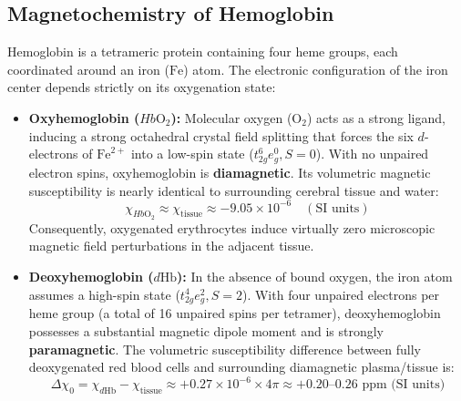 \documentclass[11pt,a4paper]{article}
\begin{document}
\subsection{Magnetochemistry of Hemoglobin}
Hemoglobin is a tetrameric protein containing four heme groups, each coordinated around an iron ($\text{Fe}$) atom. The electronic configuration of the iron center depends strictly on its oxygenation state:
\begin{itemize}[leftmargin=2em]
    \item \textbf{Oxyhemoglobin ($Hb\text{O}_2$):} Molecular oxygen ($\text{O}_2$) acts as a strong ligand, inducing a strong octahedral crystal field splitting that forces the six $d$-electrons of $\text{Fe}^{2+}$ into a low-spin state ($t_{2g}^6 e_g^0, S = 0$). With no unpaired electron spins, oxyhemoglobin is \textbf{diamagnetic}. Its volumetric magnetic susceptibility is nearly identical to surrounding cerebral tissue and water:
    \begin{equation}
        \chi_{Hb\text{O}_2} \approx \chi_{\text{tissue}} \approx -9.05 \times 10^{-6} \quad (\text{SI units})
    \end{equation}
    Consequently, oxygenated erythrocytes induce virtually zero microscopic magnetic field perturbations in the adjacent tissue.
    \item \textbf{Deoxyhemoglobin ($d\text{Hb}$):} In the absence of bound oxygen, the iron atom assumes a high-spin state ($t_{2g}^4 e_g^2, S = 2$). With four unpaired electrons per heme group (a total of 16 unpaired spins per tetramer), deoxyhemoglobin possesses a substantial magnetic dipole moment and is strongly \textbf{paramagnetic}. The volumetric susceptibility difference between fully deoxygenated red blood cells and surrounding diamagnetic plasma/tissue is:
    \begin{equation}
        \Delta \chi_0 = \chi_{d\text{Hb}} - \chi_{\text{tissue}} \approx +0.27 \times 10^{-6} \times 4\pi \approx +0.20\text{--}0.26\text{ ppm (SI units)}
    \end{equation}
\end{itemize}
\end{document}
